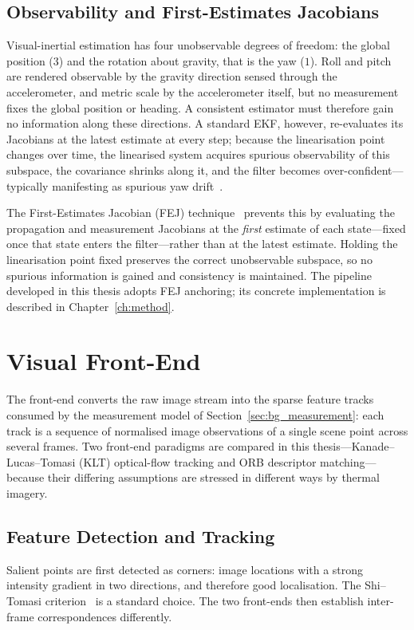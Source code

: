 \subsection{Observability and First-Estimates Jacobians}
\label{sec:bg_fej}
Visual-inertial estimation has four unobservable degrees of freedom: the global position ($3$) and the rotation about gravity, that is the yaw ($1$). Roll and pitch are rendered observable by the gravity direction sensed through the accelerometer, and metric scale by the accelerometer itself, but no measurement fixes the global position or heading. A consistent estimator must therefore gain no information along these directions. A standard EKF, however, re-evaluates its Jacobians at the latest estimate at every step; because the linearisation point changes over time, the linearised system acquires spurious observability of this subspace, the covariance shrinks along it, and the filter becomes over-confident---typically manifesting as spurious yaw drift~\cite{Huang_2010}.

The First-Estimates Jacobian (FEJ) technique~\cite{Huang_2010, Li_Mourikis_2013} prevents this by evaluating the propagation and measurement Jacobians at the \emph{first} estimate of each state---fixed once that state enters the filter---rather than at the latest estimate. Holding the linearisation point fixed preserves the correct unobservable subspace, so no spurious information is gained and consistency is maintained. The pipeline developed in this thesis adopts FEJ anchoring; its concrete implementation is described in Chapter~\ref{ch:method}.

\section{Visual Front-End}
\label{sec:bg_frontend}
The front-end converts the raw image stream into the sparse feature tracks consumed by the measurement model of Section~\ref{sec:bg_measurement}: each track is a sequence of normalised image observations of a single scene point across several frames. Two front-end paradigms are compared in this thesis---Kanade--Lucas--Tomasi (KLT) optical-flow tracking and ORB descriptor matching---because their differing assumptions are stressed in different ways by thermal imagery.

\subsection{Feature Detection and Tracking}
\label{sec:bg_tracking}
Salient points are first detected as corners: image locations with a strong intensity gradient in two directions, and therefore good localisation. The Shi--Tomasi criterion~\cite{Shi_1994} is a standard choice. The two front-ends then establish inter-frame correspondences differently.

